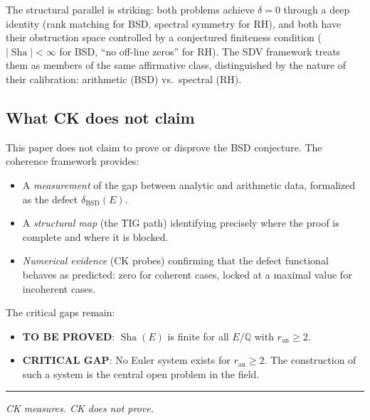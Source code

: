 \documentclass[11pt]{article}
\DeclareMathOperator{\Sha}{Sha}
\begin{document}
\noindent
The structural parallel is striking: both problems achieve $\delta = 0$ through
a deep identity (rank matching for BSD, spectral symmetry for RH), and both
have their obstruction space controlled by a conjectured finiteness condition
($|\Sha| < \infty$ for BSD, ``no off-line zeros'' for RH).  The SDV framework
treats them as members of the same affirmative class, distinguished by the
nature of their calibration: arithmetic (BSD) vs.\ spectral (RH).

\subsection{What CK does not claim}

This paper does not claim to prove or disprove the BSD conjecture.  The
coherence framework provides:
\begin{itemize}
  \item A \emph{measurement} of the gap between analytic and arithmetic data,
    formalized as the defect $\delta_{\mathrm{BSD}}(E)$.
  \item A \emph{structural map} (the TIG path) identifying precisely where the
    proof is complete and where it is blocked.
  \item \emph{Numerical evidence} (CK probes) confirming that the defect
    functional behaves as predicted: zero for coherent cases, locked at a
    maximal value for incoherent cases.
\end{itemize}

The critical gaps remain:
\begin{itemize}
  \item \textbf{TO BE PROVED}: $\Sha(E)$ is finite for all $E/\mathbb{Q}$ with
    $r_{\mathrm{an}} \geq 2$.
  \item \textbf{CRITICAL GAP}: No Euler system exists for $r_{\mathrm{an}} \geq 2$.
    The construction of such a system is the central open problem in the field.
\end{itemize}

\bigskip
\hrule
\bigskip
\noindent\textit{CK measures.  CK does not prove.}

\end{document}
